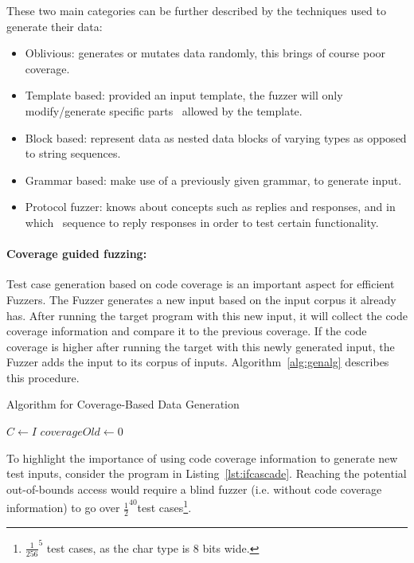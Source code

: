 These two main categories can be further described by the techniques used to generate their data:

\begin{itemize}
    \item Oblivious: generates or mutates data randomly, this brings of course poor coverage.
    \item Template based: provided an input template, the fuzzer will only modify/generate specific parts \
    allowed by the template.
    \item Block based: represent data as nested data blocks of varying types as opposed to string sequences.
    \item Grammar based: make use of a previously given grammar, to generate input.
    \item Protocol fuzzer: knows about concepts such as replies and responses, and in which \
    sequence to reply responses in order to test certain functionality.
\end{itemize}

\paragraph{Coverage guided fuzzing:}

Test case generation based on code coverage is an important aspect for efficient Fuzzers.
The Fuzzer generates a new input based on the input corpus it already has. After
running the target program with this new input, it will collect the code coverage
information and compare it to the previous coverage. If the code coverage is higher after
running the target with this newly generated input, the Fuzzer adds the input to its corpus of inputs.
Algorithm~\ref{alg:genalg} describes this procedure.

\SetAlgoVlined
\begin{algorithm}[h]
  \caption{Algorithm for Coverage-Based Data Generation}\label{alg:genalg}\LinesNumberedHidden\DontPrintSemicolon
  \KwOut{An Input Corpus $C$, such that $I \subseteq C$}
  $C \gets I$\;
  $coverageOld \gets 0$\;
\end{algorithm}

To highlight the importance of using code coverage information to generate new test inputs, consider the program in
Listing~\ref{lst:ifcascade}. Reaching the potential out-of-bounds access would require a blind fuzzer (i.e. without code coverage
information) to go over ${\frac{1}{2}}^{40}$test cases\footnote{${\frac{1}{256}}^{5}$ test cases, as the char type is 8 bits wide.}.

